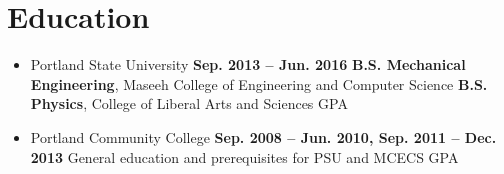 \documentclass[letterpaper]{article}
\begin{document}
\section{Education}
\begin{center}
\begin{itemize}
\item Portland State University		\hfill\textbf{Sep. 2013 -- Jun. 2016}
	\subitem \textbf{B.S. Mechanical Engineering}, Maseeh College of Engineering and Computer Science 
	\subitem\textbf{B.S. Physics}, College of Liberal Arts and Sciences
	 GPA
\\
\item Portland Community College  \hfill\textbf{Sep. 2008 -- Jun. 2010, Sep. 2011 -- Dec. 2013}
	\subitem General education and prerequisites for PSU and MCECS 
	 GPA
\end{itemize}

% 
% 
% 
% 
\end{center}

\end{document}
